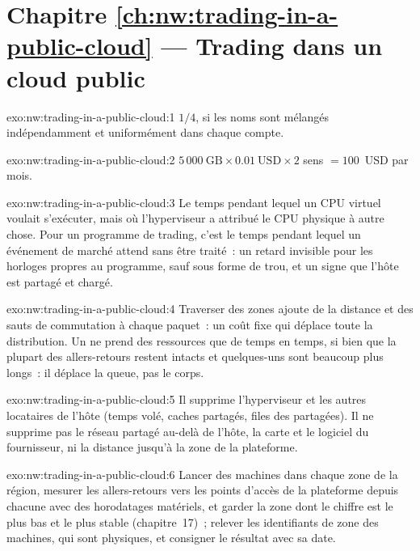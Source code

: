 \section*{Chapitre \ref{ch:nw:trading-in-a-public-cloud} --- Trading dans un cloud public}

\begin{solution}{exo:nw:trading-in-a-public-cloud:1}
$1/4$, si les noms sont mélangés indépendamment et uniformément dans chaque compte.
\end{solution}

\begin{solution}{exo:nw:trading-in-a-public-cloud:2}
$5\,000~\mathrm{GB} \times 0.01~\mathrm{USD} \times 2$ sens $= 100$~USD par mois.
\end{solution}

\begin{solution}{exo:nw:trading-in-a-public-cloud:3}
Le temps pendant lequel un CPU virtuel voulait s'exécuter, mais où l'hyperviseur a attribué le CPU physique à autre chose. Pour un programme de trading, c'est
le temps pendant lequel un événement de marché attend sans être traité~: un retard invisible pour les horloges propres au programme, sauf sous forme de trou, et un signe que l'hôte est partagé et chargé.
\end{solution}

\begin{solution}{exo:nw:trading-in-a-public-cloud:4}
Traverser des zones ajoute de la distance et des sauts de commutation à chaque paquet~: un coût fixe qui déplace toute la distribution. Un  ne
prend des ressources que de temps en temps, si bien que la plupart des allers-retours restent intacts et quelques-uns sont beaucoup plus longs~: il déplace la queue, pas le corps.
\end{solution}

\begin{solution}{exo:nw:trading-in-a-public-cloud:5}
Il supprime l'hyperviseur et les autres locataires de l'hôte (temps volé, caches partagés, files des  partagées). Il ne supprime pas le réseau
partagé au-delà de l'hôte, la carte et le logiciel du fournisseur, ni la distance jusqu'à la zone de la plateforme.
\end{solution}

\begin{solution}{exo:nw:trading-in-a-public-cloud:6}
Lancer des machines dans chaque zone de la région, mesurer les allers-retours vers les points d'accès de la plateforme depuis chacune avec des horodatages matériels, et garder la zone
dont le chiffre est le plus bas et le plus stable (chapitre~17)~; relever les identifiants de zone des machines, qui sont physiques, et consigner le résultat avec sa date.
\end{solution}

